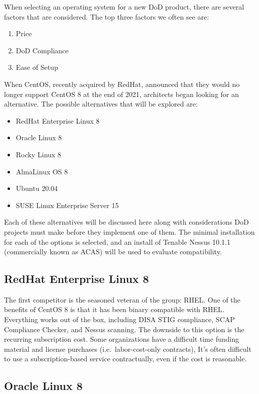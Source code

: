 When selecting an operating system for a new DoD product, there are several factors that are considered. The top three factors we often see are:
\begin{enumerate}
	\item Price
	\item DoD Compliance
	\item Ease of Setup
\end{enumerate}

When CentOS, recently acquired by RedHat, announced that they would no longer support CentOS 8 at the end of 2021,\autocite{20220321:centos-eol} architects began looking for an alternative. The possible alternatives that will be explored are:
\begin{itemize}
	\item RedHat Enterprise Linux 8
	\item Oracle Linux 8
	\item Rocky Linux 8
	\item AlmaLinux OS 8
	\item Ubuntu 20.04
	\item SUSE Linux Enterprise Server 15
\end{itemize}

Each of these alternatives will be discussed here along with considerations DoD projects must make before they implement one of them. The minimal installation for each of the options is selected, and an install of Tenable Nessus 10.1.1 (commercially known as ACAS) will be used to evaluate compatibility.

\subsection{RedHat Enterprise Linux 8}

The first competitor is the seasoned veteran of the group: RHEL. One of the benefits of CentOS 8 is that it has been binary compatible with RHEL. Everything works out of the box, including DISA STIG compliance, SCAP Compliance Checker, and Nessus scanning. The downside to this option is the recurring subscription cost. Some organizations have a difficult time funding material and license purchases (i.e.\ labor-cost-only contracts), It's often difficult to use a subscription-based service contractually, even if the cost is reasonable.

\subsection{Oracle Linux 8}


